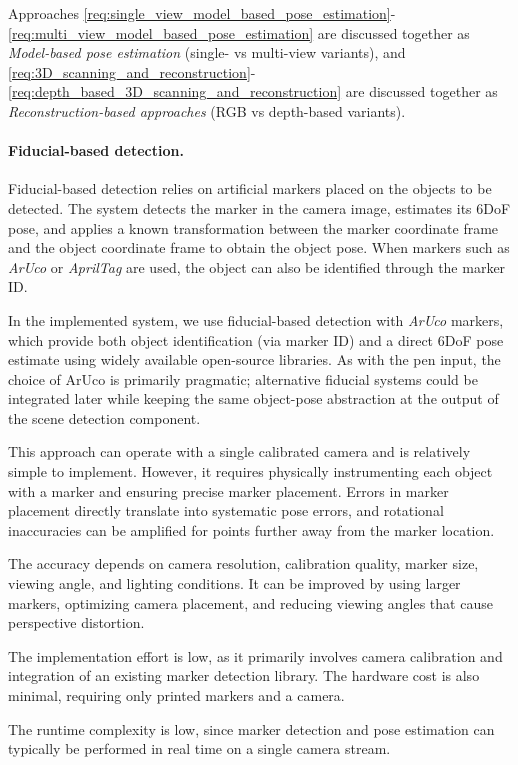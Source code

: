 Approaches \ref{req:single_view_model_based_pose_estimation}-\ref{req:multi_view_model_based_pose_estimation} are discussed together as \emph{Model-based pose estimation} (single- vs multi-view variants), and \ref{req:3D_scanning_and_reconstruction}-\ref{req:depth_based_3D_scanning_and_reconstruction} are discussed together as \emph{Reconstruction-based approaches} (RGB vs depth-based variants).

\paragraph{Fiducial-based detection.}
Fiducial-based detection relies on artificial markers placed on the objects to be detected. The system detects the marker in the camera image, estimates its 6DoF pose, and applies a known transformation between the marker coordinate frame and the object coordinate frame to obtain the object pose. When markers such as \emph{ArUco} or \emph{AprilTag} are used, the object can also be identified through the marker ID.

In the implemented system, we use fiducial-based detection with \emph{ArUco} markers, which provide both object identification (via marker ID) and a direct 6DoF pose estimate using widely available open-source libraries. As with the pen input, the choice of ArUco is primarily pragmatic; alternative fiducial systems could be integrated later while keeping the same object-pose abstraction at the output of the scene detection component.

This approach can operate with a single calibrated camera and is relatively simple to implement. However, it requires physically instrumenting each object with a marker and ensuring precise marker placement. Errors in marker placement directly translate into systematic pose errors, and rotational inaccuracies can be amplified for points further away from the marker location.

The accuracy depends on camera resolution, calibration quality, marker size, viewing angle, and lighting conditions. It can be improved by using larger markers, optimizing camera placement, and reducing viewing angles that cause perspective distortion.

The implementation effort is low, as it primarily involves camera calibration and integration of an existing marker detection library. The hardware cost is also minimal, requiring only printed markers and a camera.

The runtime complexity is low, since marker detection and pose estimation can typically be performed in real time on a single camera stream.

